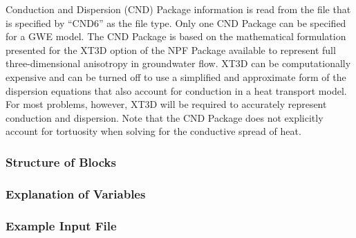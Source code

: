 Conduction and Dispersion (CND) Package information is read from the file that is specified by ``CND6'' as the file type.  Only one CND Package can be specified for a GWE model.  The CND Package is based on the mathematical formulation presented for the XT3D option of the NPF Package available to represent full three-dimensional anisotropy in groundwater flow.  XT3D can be computationally expensive and can be turned off to use a simplified and approximate form of the dispersion equations that also account for conduction in a heat transport model.  For most problems, however, XT3D will be required to accurately represent conduction and dispersion.  Note that the CND Package does not explicitly account for tortuosity when solving for the conductive spread of heat.

\vspace{5mm}
\subsubsection{Structure of Blocks}



\vspace{5mm}
\subsubsection{Explanation of Variables}
\begin{description}

\end{description}

\vspace{5mm}
\subsubsection{Example Input File}


